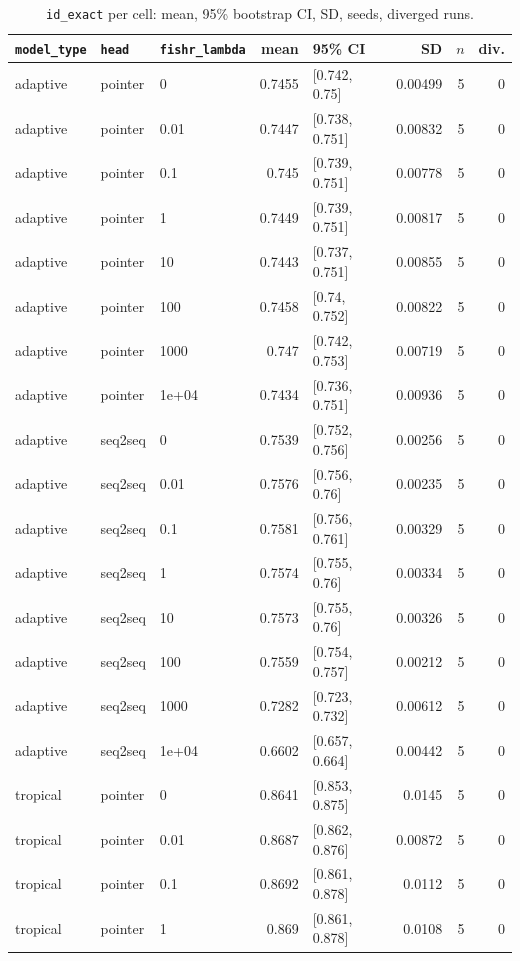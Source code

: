 \documentclass[10pt]{article}
\begin{document}
{\small
\begin{longtable}{lllrlrrr}
\caption{\texttt{id\_exact} per cell: mean, 95\% bootstrap CI, SD, seeds, diverged runs.}\label{tab:summary-id_exact}\\
\toprule
\texttt{model\_type} & \texttt{head} & \texttt{fishr\_lambda} & mean & 95\% CI & SD & $n$ & div.\\
\midrule
\endhead
adaptive & pointer & 0 & 0.7455 & [0.742, 0.75] & 0.00499 & 5 & 0\\
adaptive & pointer & 0.01 & 0.7447 & [0.738, 0.751] & 0.00832 & 5 & 0\\
adaptive & pointer & 0.1 & 0.745 & [0.739, 0.751] & 0.00778 & 5 & 0\\
adaptive & pointer & 1 & 0.7449 & [0.739, 0.751] & 0.00817 & 5 & 0\\
adaptive & pointer & 10 & 0.7443 & [0.737, 0.751] & 0.00855 & 5 & 0\\
adaptive & pointer & 100 & 0.7458 & [0.74, 0.752] & 0.00822 & 5 & 0\\
adaptive & pointer & 1000 & 0.747 & [0.742, 0.753] & 0.00719 & 5 & 0\\
adaptive & pointer & 1e+04 & 0.7434 & [0.736, 0.751] & 0.00936 & 5 & 0\\
adaptive & seq2seq & 0 & 0.7539 & [0.752, 0.756] & 0.00256 & 5 & 0\\
adaptive & seq2seq & 0.01 & 0.7576 & [0.756, 0.76] & 0.00235 & 5 & 0\\
adaptive & seq2seq & 0.1 & 0.7581 & [0.756, 0.761] & 0.00329 & 5 & 0\\
adaptive & seq2seq & 1 & 0.7574 & [0.755, 0.76] & 0.00334 & 5 & 0\\
adaptive & seq2seq & 10 & 0.7573 & [0.755, 0.76] & 0.00326 & 5 & 0\\
adaptive & seq2seq & 100 & 0.7559 & [0.754, 0.757] & 0.00212 & 5 & 0\\
adaptive & seq2seq & 1000 & 0.7282 & [0.723, 0.732] & 0.00612 & 5 & 0\\
adaptive & seq2seq & 1e+04 & 0.6602 & [0.657, 0.664] & 0.00442 & 5 & 0\\
tropical & pointer & 0 & 0.8641 & [0.853, 0.875] & 0.0145 & 5 & 0\\
tropical & pointer & 0.01 & 0.8687 & [0.862, 0.876] & 0.00872 & 5 & 0\\
tropical & pointer & 0.1 & 0.8692 & [0.861, 0.878] & 0.0112 & 5 & 0\\
tropical & pointer & 1 & 0.869 & [0.861, 0.878] & 0.0108 & 5 & 0\\

\end{longtable}}
\end{document}

